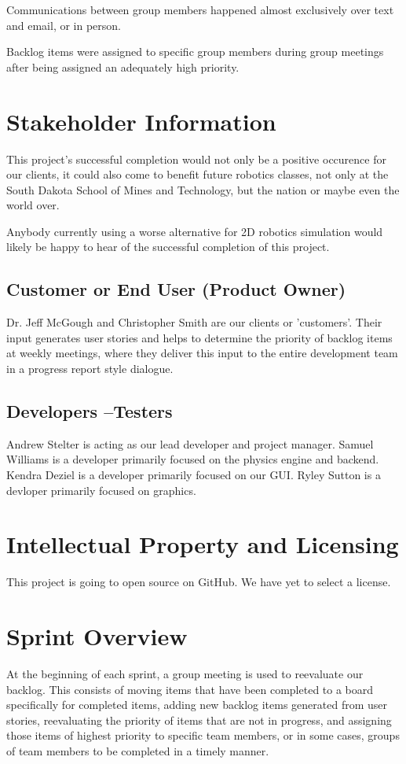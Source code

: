 Communications between group members happened almost exclusively over text and email, or in person.

Backlog items were assigned to specific group members during group meetings after being assigned an adequately high priority.


\section{Stakeholder Information}
This project's successful completion would not only be a positive occurence for our clients, it could also come to benefit future robotics classes, not only at the South Dakota School of Mines and Technology, but the nation or maybe even the world over.

Anybody currently using a worse alternative for 2D robotics simulation would likely be happy to hear of the successful completion of this project.

\subsection{Customer or End User (Product Owner)}
Dr. Jeff McGough and Christopher Smith are our clients or 'customers'. Their input generates user stories and helps to determine the priority of backlog items at weekly meetings, where they deliver this input to the entire development team in a progress report style dialogue.

\subsection{Developers --Testers}
Andrew Stelter is acting as our lead developer and project manager. Samuel Williams is a developer primarily focused on the physics engine and backend. Kendra Deziel is a developer primarily focused on our GUI. Ryley Sutton is a devloper primarily focused on graphics.

\section{Intellectual Property and Licensing}
This project is going to open source on GitHub. We have yet to select a license. 

\section{Sprint  Overview}
At the beginning of each sprint, a group meeting is used to reevaluate our backlog. This consists of moving items that have been completed to a board specifically for completed items, adding new backlog items generated from user stories, reevaluating the priority of items that are not in progress, and assigning those items of highest priority to specific team members, or in some cases, groups of team members to be completed in a timely manner.

